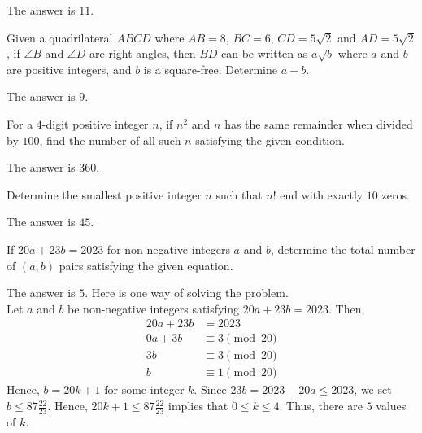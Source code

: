 \begin{solution}
The answer is $11$.
\end{solution}

\begin{problem}
Given a quadrilateral $ABCD$ where $AB=8$, $BC=6$, $CD=5\sqrt{2}$ and $AD=5\sqrt{2}$, if $\angle B$ and $\angle D$ are right angles, then $BD$ can be written as $a\sqrt{b}$ where $a$ and $b$ are positive integers, and $b$ is a square-free. Determine $a+b$.
\end{problem}

\begin{solution}
The answer is $9$.
\end{solution}

\begin{problem}
For a $4$-digit positive integer $n$, if $n^2$ and $n$ has the same remainder when divided by $100$, find the number of all such $n$ satisfying the given condition.
\end{problem}

\begin{solution}
The answer is $360$.
\end{solution}

\begin{problem}
Determine the smallest positive integer $n$ such that $n!$ end with exactly $10$ zeros.
\end{problem}

\begin{solution}
The answer is $45$.
\end{solution}

\begin{problem}
If $20a+23b=2023$ for non-negative integers $a$ and $b$, determine the total number of $(a,b)$ pairs satisfying the given equation.
\end{problem}

\begin{solution}
The answer is $5$. Here is one way of solving the problem.\\
	Let $a$ and $b$ be non-negative integers satisfying $20a+23b=2023$. Then,
	\begin{align*}
		20a+23b&=2023\\
		0a+3b&\equiv 3 \pmod{20}\\
		3b&\equiv 3 \pmod{20}\\
		b&\equiv 1 \pmod{20}
	\end{align*}
	Hence, $b=20k+1$ for some integer $k$. Since $23b=2023-20a\leq 2023$, we set $b\leq 87\frac{22}{23}$. Hence, $20k+1 \leq 87\frac{22}{23}$ implies that $0\leq k \leq 4$. Thus, there are $5$ values of $k$.
\end{solution}

